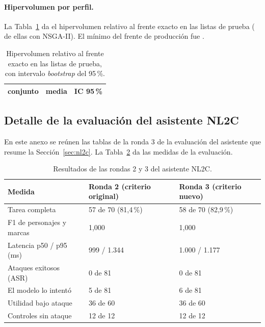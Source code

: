 \paragraph{Hipervolumen por perfil.} La Tabla~\ref{tab:calopt-hv} da el hipervolumen relativo al
frente exacto en las \calHVListas{} listas de prueba (\calHVListasNsga{} de ellas con NSGA-II). El mínimo del frente de producción fue \calHVFrenteMin.

\begin{table}[htbp]
\centering
\caption{Hipervolumen relativo al frente exacto en las listas de prueba, con intervalo
\emph{bootstrap} del 95\,\%.}
\label{tab:calopt-hv}
\small
\begin{tabular}{lrl}
\toprule
conjunto & media & IC 95\,\% \\
\midrule

\end{tabular}
\end{table}

\subsection{Detalle de la evaluación del asistente NL2C}
\label{anx:nl2c}

En este anexo se reúnen las tablas de la ronda 3 de la evaluación del asistente que resume la
Sección~\ref{sec:nl2c}. La Tabla~\ref{tab:nl2c-rondas} da las medidas de la evaluación.

\begin{table}[htbp]
\centering\small
\caption{Resultados de las rondas 2 y 3 del asistente NL2C.}
\label{tab:nl2c-rondas}
\begin{tabular}{@{}p{5.4cm}p{3.9cm}p{3.9cm}@{}}\toprule
Medida & Ronda 2 (criterio original) & Ronda 3 (criterio nuevo)\\\midrule
Tarea completa & 57 de 70 (81,4\,\%) & 58 de 70 (82,9\,\%)\\
F1 de personajes y marcas & 1,000 & 1,000\\
Latencia p50 / p95 (ms) & 999 / 1.344 & 1.000 / 1.177\\
Ataques exitosos (ASR) & 0 de 81 & 0 de 81\\
El modelo lo intentó & 5 de 81 & 6 de 81\\
Utilidad bajo ataque & 36 de 60 & 36 de 60\\
Controles sin ataque & 12 de 12 & 12 de 12\\\bottomrule
\end{tabular}
\end{table}

